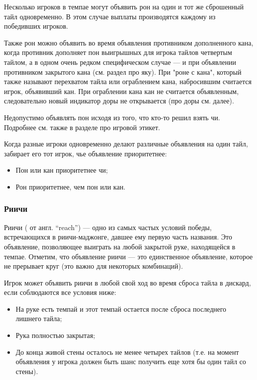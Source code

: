Несколько игроков в темпае могут объявить рон на один и тот же сброшенный тайл одновременно. В этом случае выплаты производятся каждому из победивших игроков. 

Также рон можно объявить во время объявления противником дополненного кана, когда противник дополняет пон выигрышных для игрока тайлов четвертым тайлом, а в одном очень редком специфическом случае --- и при объявлении противником закрытого кана (см. раздел про яку). При "роне с кана", который также называют перехватом тайла или ограблением кана, набросившим считается игрок, объявивший кан. При ограблении кана кан не считается объявленным, следовательно новый индикатор доры не открывается (про доры см. далее).

Недопустимо объявлять пон исходя из того, что кто-то решил взять чи. Подробнее см. также в разделе про игровой этикет.

Когда разные игроки одновременно делают различные объявления на один тайл, забирает его тот игрок, чье объявление приоритетнее:

\begin{itemize}
	\item Пон или кан приоритетнее чи;
	\item Рон приоритетнее, чем пон или кан.
\end{itemize}

\subsubsection{Риичи}

Риичи ( от англ. “reach”) --- одно из самых частых условий победы, встречающихся в риичи-маджонге, давшее ему первую часть названия. Это объявление, позволяющее выиграть на любой закрытой руке, находящейся в темпае. Отметим, что объявление риичи --- это единственное объявление, которое не прерывает круг (это важно для некоторых комбинаций).

Игрок может объявить риичи в любой свой ход во время сброса тайла в дискард, если соблюдаются все условия ниже:

\begin{itemize}
	\item На руке есть темпай и этот темпай остается после сброса последнего лишнего тайла;
	\item Рука полностью закрытая;
	\item До конца живой стены осталось не менее четырех тайлов (т.е. на момент объявления у игрока должен быть шанс получить еще хотя бы один тайл со стены).
\end{itemize}


